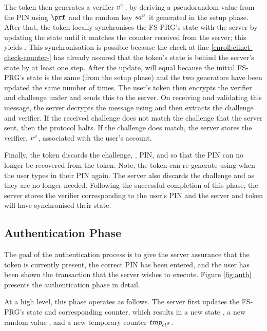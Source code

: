 The token then generates a verifier ${v}^{\scriptscriptstyle U}$, by deriving a pseudorandom value from the PIN using $\prf$ and the random key ${sa}^{\scriptscriptstyle U}$ it generated in the setup phase.  After that, the token locally synchronises the FS-PRG's state with the server by updating the state until it matches the counter received from the server; this yields . This synchronisation is possible because the check at line \ref{enroll:clinet-check-counter-} has already assured that the token's state is behind the server's state by at least one step. After the update,  will equal  because the initial FS-PRG's state is the same (from the setup phase) and the two generators have been updated the same number of times. The user's token then encrypts the verifier and challenge under  and sends this to the server. 
On receiving and validating this message, the server decrypts the message using  and then extracts the challenge and verifier.
If the received challenge does not match the challenge that the server sent, then the protocol halts.
If the challenge does match, the server stores the verifier, ${v}^{\scriptscriptstyle S}$,  associated with the user's account.

Finally, the token discards the challenge, , PIN, and \VC{\verifier} so that the PIN can no longer be recovered from the token. Note, the token can re-generate \VC{\verifier} using \VC{\salt} when the user types in their PIN again. The server also discards the challenge and  as they are no longer needed. Following the successful completion of this phase, the server stores the verifier corresponding to the user's PIN and the server and token will have synchronised their state.

\vspace{-2mm}
\subsection{Authentication Phase}
\label{sec:authentication}

The goal of the authentication process is to give the server assurance that the token is currently present, the correct PIN has been entered, and the user has been shown the transaction that the server wishes to execute. Figure \ref{fig:auth} presents the authentication phase in detail. 



At a high level, this phase operates as follows. The server first updates the FS-PRG's state and corresponding counter, which results in a new state \VS{\state}, a new random value  , and a new temporary counter ${tmp}_{{ct}^{\scriptscriptstyle S}}$. 

